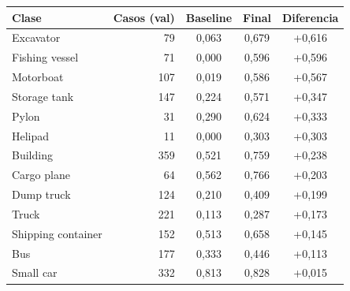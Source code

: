 \begin{tabular}{lrccc}
\toprule
Clase & Casos (val) & Baseline & Final & Diferencia \\
\midrule
Excavator & 79 & 0,063 & 0,679 & +0,616 \\
Fishing vessel & 71 & 0,000 & 0,596 & +0,596 \\
Motorboat & 107 & 0,019 & 0,586 & +0,567 \\
Storage tank & 147 & 0,224 & 0,571 & +0,347 \\
Pylon & 31 & 0,290 & 0,624 & +0,333 \\
Helipad & 11 & 0,000 & 0,303 & +0,303 \\
Building & 359 & 0,521 & 0,759 & +0,238 \\
Cargo plane & 64 & 0,562 & 0,766 & +0,203 \\
Dump truck & 124 & 0,210 & 0,409 & +0,199 \\
Truck & 221 & 0,113 & 0,287 & +0,173 \\
Shipping container & 152 & 0,513 & 0,658 & +0,145 \\
Bus & 177 & 0,333 & 0,446 & +0,113 \\
Small car & 332 & 0,813 & 0,828 & +0,015 \\
\bottomrule
\end{tabular}
